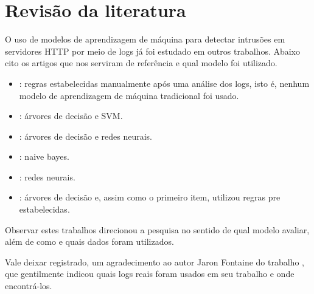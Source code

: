 
\chapter{Revisão da literatura}
\label{cap:fundamentation}

O uso de modelos de aprendizagem de máquina para detectar intrusões em servidores HTTP 
por meio de logs já foi estudado em outros trabalhos. Abaixo cito os artigos que nos
serviram de referência e qual modelo foi utilizado.

\begin{itemize}
    \item \cite{ref:art3}: regras estabelecidas manualmente após uma análise dos logs,
    isto é, nenhum modelo de aprendizagem de máquina tradicional foi usado.
    \item \cite{ref:art4}: árvores de decisão e SVM.
    \item \cite{ref:art6}: árvores de decisão e redes neurais.
    \item \cite{ref:art2}: naive bayes.
    \item \cite{ref:art7}: redes neurais.
    \item \cite{ref:art1}: árvores de decisão e, assim como o primeiro item, utilizou 
    regras pre estabelecidas.
\end{itemize}

Observar estes trabalhos direcionou a pesquisa no sentido de qual modelo avaliar, além de como 
e quais dados foram utilizados.

Vale deixar registrado, um agradecimento ao autor Jaron Fontaine do trabalho \cite{ref:art6}, que gentilmente
indicou quais logs reais foram usados em seu trabalho e onde encontrá-los.
